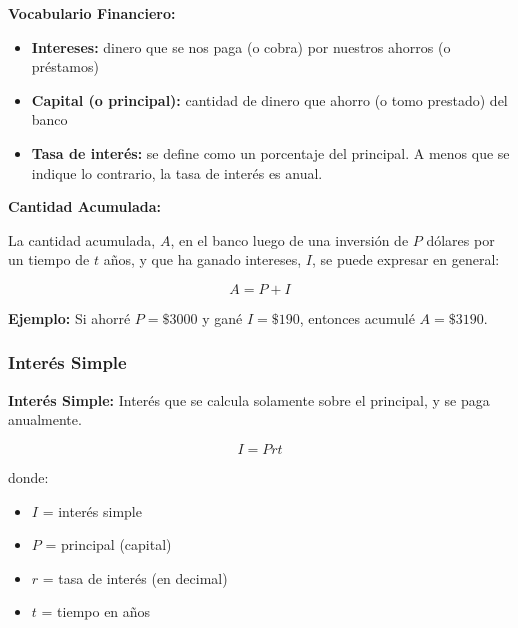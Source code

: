 
\begin{definition}
\textbf{Vocabulario Financiero:}
\begin{itemize}
    \item \textbf{Intereses:} dinero que se nos paga (o cobra) por nuestros ahorros (o préstamos)
    \item \textbf{Capital (o principal):} cantidad de dinero que ahorro (o tomo prestado) del banco
    \item \textbf{Tasa de interés:} se define como un porcentaje del principal. A menos que se indique lo contrario, la tasa de interés es anual.
\end{itemize}
\end{definition}

\textbf{Cantidad Acumulada:}

La cantidad acumulada, $A$, en el banco luego de una inversión de $P$ dólares por un tiempo de $t$ años, y que ha ganado intereses, $I$, se puede expresar en general:

$$A = P + I$$

\textbf{Ejemplo:} Si ahorré $P = \$3000$ y gané $I = \$190$, entonces acumulé $A = \$3190$.

\subsubsection*{Interés Simple}

\begin{definition}
\textbf{Interés Simple:} Interés que se calcula solamente sobre el principal, y se paga anualmente.

$$I = Prt$$

donde:
\begin{itemize}
    \item $I$ = interés simple
    \item $P$ = principal (capital)
    \item $r$ = tasa de interés (en decimal)
    \item $t$ = tiempo en años
\end{itemize}
\end{definition}

\newpage

